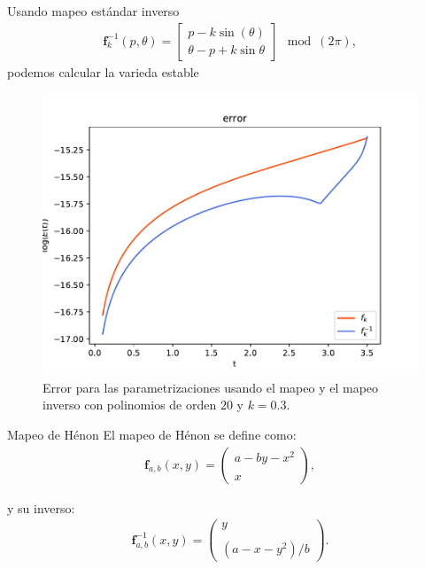 \documentclass[11pt]{beamer}
\theoremstyle{definition}
\begin{document}
\begin{frame}
Usando mapeo est\'andar inverso
\begin{eqnarray}
\mathbf{f}_{k}^{-1}(p,\theta) = \left[\begin{array}{c}
p  -k\sin(\theta) \\
\theta-p+k\sin{\theta}
\end{array}\right] \mod(2\pi), \label{mapeo estandar inverso}
\end{eqnarray}
podemos calcular la varieda estable
\begin{figure}[H]
\centering
\includegraphics[scale=0.4]{error_inversa}
\caption{Error para las parametrizaciones usando el mapeo y el mapeo inverso con polinomios de orden $20$ y $k=0.3$. }
\label{erroresinverso}
\end{figure}
\end{frame}
\begin{frame}{Mapeo de H\'enon}
El mapeo de Hénon se define como:
\begin{eqnarray}
\mathbf{f}_{a,b}(x,y)=\left( \begin{array}{lcc}
a-by-x^{2}\\
\\ x
\end{array}
\right), \label{Henon}
\end{eqnarray}

y su inverso:
\begin{eqnarray}
\mathbf{f}^{-1}_{a,b}(x,y)=\left( \begin{array}{lcc}
y\\
\\ (a-x-y^{2})/b
\end{array}
\right). \label{HenonI}
\end{eqnarray} 


\end{frame}
\end{document}
